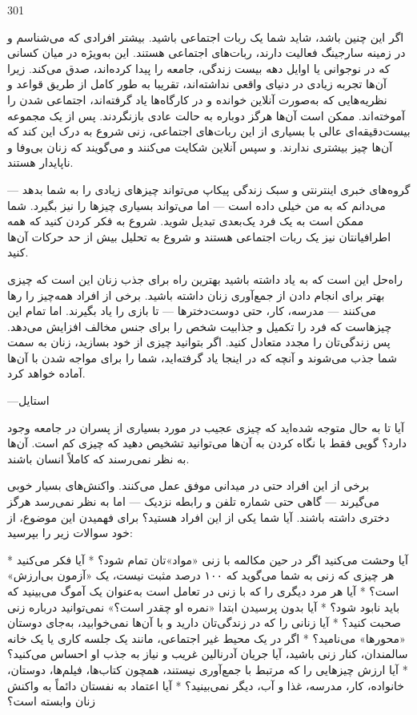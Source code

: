 301

اگر این چنین باشد، شاید شما یک ربات اجتماعی باشید. بیشتر افرادی که می‌شناسم و در زمینه سارجینگ فعالیت دارند، ربات‌های اجتماعی هستند. این به‌ویژه در میان کسانی که در نوجوانی یا اوایل دهه بیست زندگی، جامعه را پیدا کرده‌اند، صدق می‌کند. زیرا آن‌ها تجربه زیادی در دنیای واقعی نداشته‌اند، تقریبا به طور کامل از طریق قواعد و نظریه‌هایی که به‌صورت آنلاین خوانده و در کارگاه‌ها یاد گرفته‌اند، اجتماعی شدن را آموخته‌اند. ممکن است آن‌ها هرگز دوباره به حالت عادی بازنگردند. پس از یک مجموعه بیست‌دقیقه‌ای عالی با بسیاری از این ربات‌های اجتماعی، زنی شروع به درک این کند که آن‌ها چیز بیشتری ندارند. و سپس آنلاین شکایت می‌کنند و می‌گویند که زنان بی‌وفا و ناپایدار هستند.

گروه‌های خبری اینترنتی و سبک زندگی پیکاپ می‌تواند چیزهای زیادی را به شما بدهد — می‌دانم که به من خیلی داده است — اما می‌تواند بسیاری چیزها را نیز بگیرد. شما ممکن است به یک فرد یک‌بعدی تبدیل شوید. شروع به فکر کردن کنید که همه اطرافیانتان نیز یک ربات اجتماعی هستند و شروع به تحلیل بیش از حد حرکات آن‌ها کنید.

راه‌حل این است که به یاد داشته باشید بهترین راه برای جذب زنان این است که چیزی بهتر برای انجام دادن از جمع‌آوری زنان داشته باشید. برخی از افراد همه‌چیز را رها می‌کنند — مدرسه، کار، حتی دوست‌دخترها — تا بازی را یاد بگیرند. اما تمام این چیزهاست که فرد را تکمیل و جذابیت شخص را برای جنس مخالف افزایش می‌دهد. پس زندگی‌تان را مجدد متعادل کنید. اگر بتوانید چیزی از خود بسازید، زنان به سمت شما جذب می‌شوند و آنچه که در اینجا یاد گرفته‌اید، شما را برای مواجه شدن با آن‌ها آماده خواهد کرد.

—استایل

آیا تا به حال متوجه شده‌اید که چیزی عجیب در مورد بسیاری از پسران در جامعه وجود دارد؟ گویی فقط با نگاه کردن به آن‌ها می‌توانید تشخیص دهید که چیزی کم است. آن‌ها به نظر نمی‌رسند که کاملاً انسان باشند.

برخی از این افراد حتی در میدانی موفق عمل می‌کنند. واکنش‌های بسیار خوبی می‌گیرند — گاهی حتی شماره تلفن و رابطه نزدیک — اما به نظر نمی‌رسد هرگز دختری داشته باشند. آیا شما یکی از این افراد هستید؟ برای فهمیدن این موضوع، از خود سوالات زیر را بپرسید:

* آیا وحشت می‌کنید اگر در حین مکالمه با زنی «مواد»تان تمام شود؟
* آیا فکر می‌کنید هر چیزی که زنی به شما می‌گوید که ۱۰۰ درصد مثبت نیست، یک «آزمون بی‌ارزش» است؟
* آیا هر مرد دیگری را که با زنی در تعامل است به‌عنوان یک آموگ می‌بینید که باید نابود شود؟
* آیا بدون پرسیدن ابتدا «نمره او چقدر است؟» نمی‌توانید درباره زنی صحبت کنید؟
* آیا زنانی را که در زندگی‌تان دارید و با آن‌ها نمی‌خوابید، به‌جای دوستان «محورها» می‌نامید؟
* اگر در یک محیط غیر اجتماعی، مانند یک جلسه کاری یا یک خانه سالمندان، کنار زنی باشید، آیا جریان آدرنالین غریب و نیاز به جذب او احساس می‌کنید؟
* آیا ارزش چیزهایی را که مرتبط با جمع‌آوری نیستند، همچون کتاب‌ها، فیلم‌ها، دوستان، خانواده، کار، مدرسه، غذا و آب، دیگر نمی‌بینید؟
* آیا اعتماد به نفستان دائماً به واکنش زنان وابسته است؟